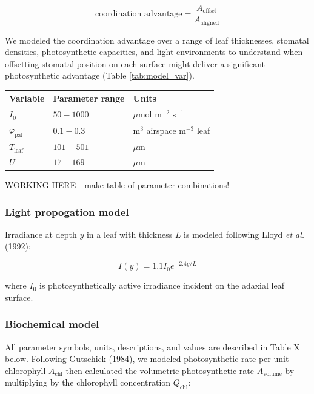 \documentclass[12pt,halfline,a4paper,]{ouparticle}
\begin{document}
\begin{equation} \label{eq:coordination_advantage}
  \text{coordination advantage} = \frac{A_\text{offset}}{A_\text{aligned}}
\end{equation}

We modeled the coordination advantage over a range of leaf thicknesses,
stomatal densities, photosynthetic capacities, and light environments to
understand when offsetting stomatal position on each surface might
deliver a significant photosynthetic advantage (Table
\ref{tab:model_var}).

\begin{longtable}[]{@{}lll@{}}
\toprule\noalign{}
Variable & Parameter range & Units \\
\midrule\noalign{}
\endhead
\bottomrule\noalign{}
\endlastfoot
\(I_0\) & \(50-1000\) & \(\mu\)mol m\(^{-2}\) s\(^{-1}\) \\
\(\varphi_\text{pal}\) & \(0.1-0.3\) & m\(^3\) airspace m\(^{-3}\)
leaf \\
\(T_\text{leaf}\) & \(101-501\) & \(\mu\)m \\
\(U\) & \(17-169\) & \(\mu\)m \\
\end{longtable}

WORKING HERE - make table of parameter combinations!

\hypertarget{light-propogation-model}{%
\subsubsection{Light propogation model}\label{light-propogation-model}}

Irradiance at depth \(y\) in a leaf with thickness \(L\) is modeled
following Lloyd \emph{et al.} (1992):

\begin{equation}\label{eq:light_propogation}
  I(y) = 1.1 I_0 e ^ {-2.4 y / L}
\end{equation}

where \(I_0\) is photosynthetically active irradiance incident on the
adaxial leaf surface.

\hypertarget{biochemical-model}{%
\subsubsection{Biochemical model}\label{biochemical-model}}

All parameter symbols, units, descriptions, and values are described in
Table X below. Following Gutschick (1984), we modeled photosynthetic
rate per unit chlorophyll \(A_\text{chl}\) then calculated the
volumetric photosynthetic rate \(A_\text{volume}\) by multiplying by the
chlorophyll concentration \(Q_\text{chl}\):
\end{document}
